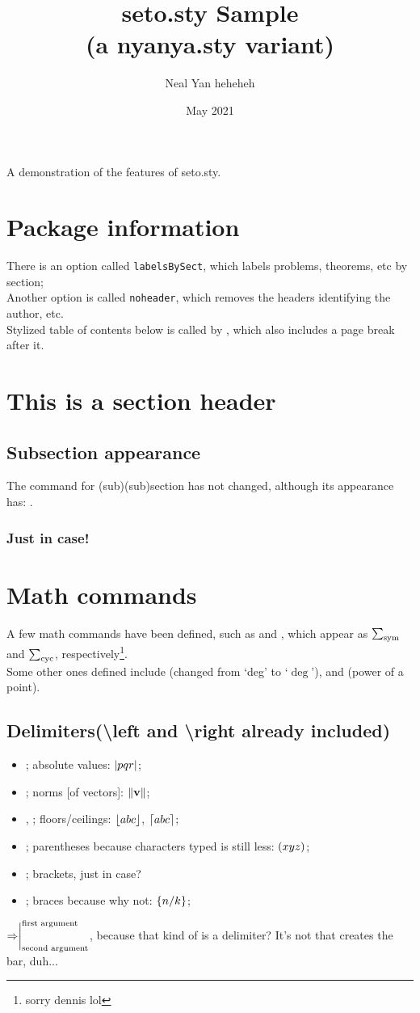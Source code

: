 \documentclass{article}
\title{seto.sty Sample\\(a nyanya.sty variant)}
\author{Neal Yan heheheh}
\date{May 2021}
\begin{document}
\maketitle
A demonstration of the features of seto.sty.
\section*{Package information}
There is an option called \texttt{labelsBySect}, which labels problems, theorems, etc by section;\\
Another option is called \texttt{noheader}, which removes the headers identifying the author, etc.\\
Stylized table of contents below is called by , which also includes a page break after it.
\toc 
\section{This is a section header}
\subsection{Subsection appearance}
The command for (sub)(sub)section has not changed, although its appearance has: .
\subsubsection{Just in case!}
\section{Math commands}
A few math commands have been defined, such as  and , which appear as $\symsum$ and $\cycsum$, respectively\footnote{sorry dennis lol}.\\
Some other ones defined include (changed from `deg' to `$\deg$'), and (power of a point).
\subsection{Delimiters(\textbackslash left and \textbackslash right already included)}
\begin{itemize}
    \item{}; absolute values: $\abs{pqr}$;
    \item{}; norms [of vectors]: $\norm{\textbf{v}}$;
    \item{}, ; floors/ceilings: $\floor{abc}$, $\ceil{abc}$;
    \item{}; parentheses because characters typed is still less: $\parenth{xyz}$;
    \item{}; brackets, just in case?
    \item{}; braces because why not: $\braces{n/k}$;
\end{itemize}
$\Rightarrow\evalat[\text{first argument}]{\text{second argument}}$, because that kind of is a delimiter? It's not  that creates the bar, duh...
\end{document}
